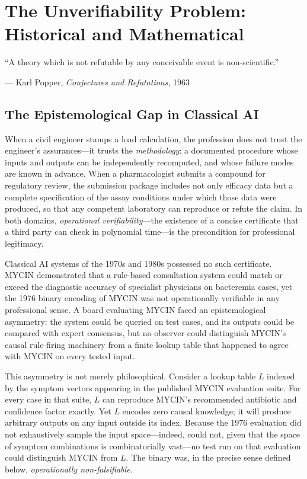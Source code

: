 
\chapter{The Unverifiability Problem: Historical and Mathematical}
\label{chap:unverifiability}

\epigraph{%
  ``A theory which is not refutable by any conceivable event is non-scientific.''
}{--- Karl Popper, \textit{Conjectures and Refutations}, 1963}

\section{The Epistemological Gap in Classical AI}
\label{sec:epistemological-gap}

When a civil engineer stamps a load calculation, the profession does not trust the
engineer's assurances—it trusts the \emph{methodology}: a documented procedure
whose inputs and outputs can be independently recomputed, and whose failure modes are
known in advance.  When a pharmacologist submits a compound for regulatory review,
the submission package includes not only efficacy data but a complete specification
of the assay conditions under which those data were produced, so that any competent
laboratory can reproduce or refute the claim.  In both domains, \emph{operational
verifiability}—the existence of a concise certificate that a third party can check
in polynomial time—is the precondition for professional legitimacy.

Classical AI systems of the 1970s and 1980s possessed no such certificate.
MYCIN \cite{shortliffe1976} demonstrated that a rule-based consultation system
could match or exceed the diagnostic accuracy of specialist physicians on
bacteremia cases, yet the 1976 binary encoding of MYCIN was not operationally
verifiable in any professional sense.  A board evaluating MYCIN faced an
epistemological asymmetry: the system could be queried on test cases, and its
outputs could be compared with expert consensus, but no observer could distinguish
MYCIN's causal rule-firing machinery from a finite lookup table that happened to
agree with MYCIN on every tested input.

This asymmetry is not merely philosophical.  Consider a lookup table $L$ indexed
by the symptom vectors appearing in the published MYCIN evaluation suite.  For
every case in that suite, $L$ can reproduce MYCIN's recommended antibiotic and
confidence factor exactly.  Yet $L$ encodes zero causal knowledge; it will
produce arbitrary outputs on any input outside its index.  Because the 1976
evaluation did not exhaustively sample the input space—indeed, could not, given
that the space of symptom combinations is combinatorially vast—no test run on that
evaluation could distinguish MYCIN from $L$.  The binary was, in the precise sense
defined below, \emph{operationally non-falsifiable}.

